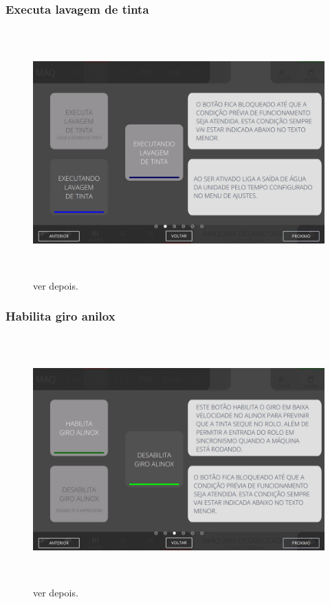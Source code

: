 \subsubsection{\small{Executa lavagem de tinta}}
\begin{figure}[h]
  \centering
  \includegraphics[width=576px,height=360px]{src/images/04-printter/02-printter/commands/e-2.png}
  \caption{ver depois.}
   \label{}
\end{figure}
\vspace*{\fill}

\newpage
\thispagestyle{fancy}
\vspace*{\fill}
\subsubsection{\small{Habilita giro anilox}}
\begin{figure}[h]
  \centering
  \includegraphics[width=576px,height=360px]{src/images/04-printter/02-printter/commands/e-3.png}
  \caption{ver depois.}
   \label{}
\end{figure}
\vspace*{\fill}

